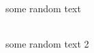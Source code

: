 \documentclass{article}
\begin{document}
some random text
\begin{tabular}{c}
\end{tabular}
some random text 2
\begin{tabular}{c}
\end{tabular}

\begin{tabular}{c}
\end{tabular}
\end{document}
